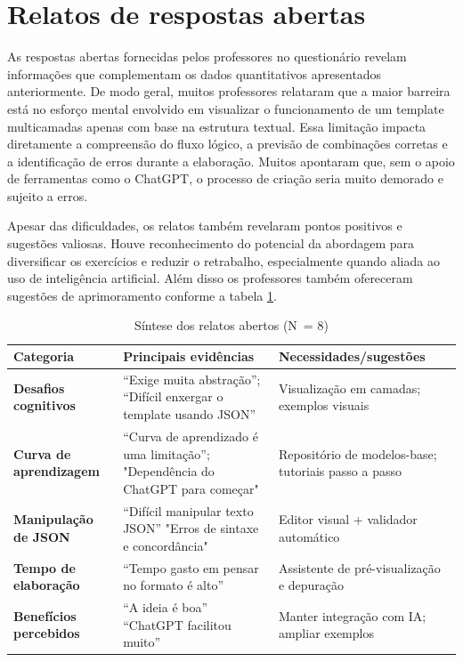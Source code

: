 	
\section{Relatos de respostas abertas}

As respostas abertas fornecidas pelos professores no questionário revelam  informações que complementam os dados quantitativos apresentados anteriormente. De modo geral, muitos professores relataram que a maior barreira está no esforço mental envolvido em visualizar o funcionamento de um template multicamadas apenas com base na estrutura textual. Essa limitação impacta diretamente a compreensão do fluxo lógico, a previsão de combinações corretas e a identificação de erros durante a elaboração. Muitos apontaram que, sem o apoio de ferramentas como o ChatGPT, o processo de criação seria muito demorado e sujeito a erros.

Apesar das dificuldades, os relatos também revelaram pontos positivos e sugestões valiosas. Houve reconhecimento do potencial da abordagem para diversificar os exercícios e reduzir o retrabalho, especialmente quando aliada ao uso de inteligência artificial. Além disso os professores também ofereceram sugestões de aprimoramento conforme a tabela \ref{tab:relatos-abertos}.


\begin{table}[H]
\centering
\caption{Síntese dos relatos abertos (N~= 8)}
\label{tab:relatos-abertos}
\begin{tabular}{|p{} |p{} |p{}|}
\hline
\textbf{Categoria} & \textbf{Principais evidências} & \textbf{Necessidades/sugestões} \\ \hline
\textbf{Desafios cognitivos} & 
    “Exige muita abstração”; \newline
    “Difícil enxergar o template usando JSON”
& Visualização em camadas; exemplos visuais \\ \hline
\textbf{Curva de aprendizagem} & 
    “Curva de aprendizado é uma limitação”;\newline
     "Dependência do ChatGPT para começar"
 & Repositório de modelos-base; tutoriais passo a passo \\ \hline
\textbf{Manipulação de JSON} & 
    “Difícil manipular texto JSON” \newline
    "Erros de sintaxe e concordância"
 & Editor visual + validador automático \\ \hline
\textbf{Tempo de elaboração} & 
    “Tempo gasto em pensar no formato é alto” 
& Assistente de pré-visualização e depuração \\ \hline
\textbf{Benefícios percebidos} & 
    “A ideia é boa” \newline
    “ChatGPT facilitou muito”
 & Manter integração com IA; ampliar exemplos \\ \hline
\end{tabular}
\end{table}

